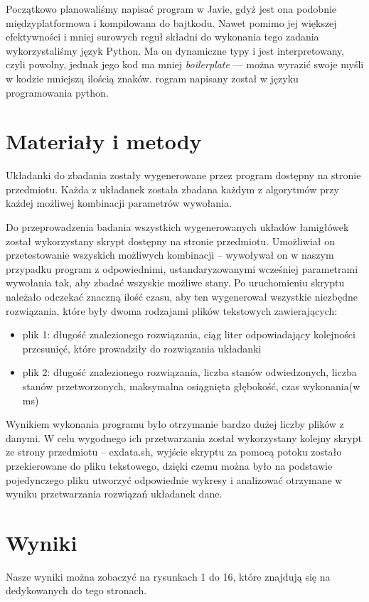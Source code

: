 \documentclass{classrep}
\begin{document}
Początkowo planowaliśmy napisać program w Javie, gdyż jest ona podobnie międzyplatformowa i kompilowana do bajtkodu.
Nawet pomimo jej większej efektywności i mniej surowych reguł składni do wykonania tego zadania wykorzystaliśmy język Python.
Ma on dynamiczne typy i jest interpretowany, czyli powolny, jednak jego kod ma mniej \emph{boilerplate} --- można wyrazić swoje myśli w kodzie mniejszą ilością znaków.
rogram napisany został w języku programowania python. 

\section{Materiały i metody}
Układanki do zbadania zostały wygenerowane przez program dostępny na stronie przedmiotu. Każda z układanek została zbadana każdym z algorytmów przy każdej możliwej kombinacji parametrów wywołania. 

Do przeprowadzenia badania wszystkich wygenerowanych układów łamigłówek został wykorzystany skrypt dostępny na stronie przedmiotu. Umożliwiał on przetestowanie wszyskich możliwych kombinacji – wywoływał on w naszym przypadku program z odpowiednimi, ustandaryzowanymi wcześniej parametrami wywołania tak, aby zbadać wszyskie możliwe stany. Po uruchomieniu skryptu należało odczekać znaczną ilość czasu, aby ten wygenerował wszystkie niezbędne rozwiązania, które były dwoma rodzajami plików tekstowych zawierających:

\begin{itemize}
    \item plik 1: długość znalezionego rozwiązania, ciąg liter odpowiadający kolejności przesunięć, które prowadziły do rozwiązania układanki
    \item plik 2: długość znalezionego rozwiązania, liczba stanów odwiedzonych, liczba stanów przetworzonych, maksymalna osiągnięta głębokość, czas wykonania(w ms)
\end{itemize}

Wynikiem wykonania programu było otrzymanie bardzo dużej liczby plików z danymi. W celu wygodnego ich przetwarzania został wykorzystany kolejny skrypt ze strony przedmiotu – exdata.sh, wyjście skryptu za pomocą potoku zostało przekierowane do pliku tekstowego, dzięki czemu można było na podstawie pojedynczego pliku utworzyć odpowiednie wykresy i analizować otrzymane w wyniku przetwarzania rozwiązań układanek dane.

\section{Wyniki}
Nasze wyniki można zobaczyć na rysunkach 1 do 16, %
które znajdują się na dedykowanych do tego stronach.
\end{document}
